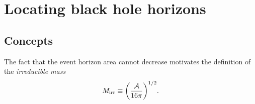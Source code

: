 %
%
%
\chapter{Locating black hole horizons}
\label{ch:7} %



\section{Concepts}
\begin{definition}
	The fact that the event horizon area cannot decrease motivates the definition of the \textit{irreducible mass}
	\begin{equation}
		M_\mathrm{irr} \equiv \qty(\frac{\mathcal{A}}{16\pi})^{1/2}.
	\end{equation}
\end{definition}

